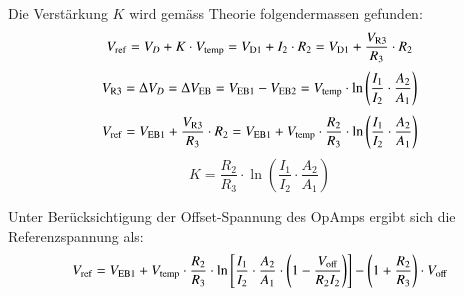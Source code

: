 \smallskip

Die Verstärkung $K$ wird gemäss Theorie folgendermassen gefunden:
 \[
    V_{\rm ref} = V_D + K \cdot V_{\rm temp} = V_{\rm D1} + I_2 \cdot R_2 = V_{\rm D1} + \frac{V_{\rm R3}}{R_3} \cdot R_2
\] 
\[
    V_{\rm R3} = \Delta V_D = \Delta V_{\rm EB} = V_{\rm EB1} - V_{\rm EB2} = V_{\rm temp} \cdot \ln \left( \frac{I_1}{I_2} \cdot \frac{A_2}{A_1} \right)
\] 
\[
    V_{\rm ref} = V_{\rm EB1} + \frac{V_{\rm R3}}{R_3} \cdot R_2 = V_{\rm EB1} + V_{\rm temp} \cdot \frac{R_2}{R_3} \cdot \ln \left( \frac{I_1}{I_2} \cdot \frac{A_2}{A_1} \right)
\] 
\[
    K = \frac{R_2}{R_3} \cdot \ln \left( \frac{I_1}{I_2} \cdot \frac{A_2}{A_1} \right)
\] 


Unter Berücksichtigung der Offset-Spannung des OpAmps ergibt sich die Referenzspannung als:
 \[
    V_{\rm ref} = V_{\rm EB1} + V_{\rm temp} \cdot \frac{R_2}{R_3} \cdot \ln \left[  \frac{I_1}{I_2} \cdot \frac{A_2}{A_1} \cdot \left( 1 - \frac{V_{\rm off}}{R_2 I_2} \right) \right] - \left(1 + \frac{R_2}{R_3} \right) \cdot V_{\rm off}
\] 


